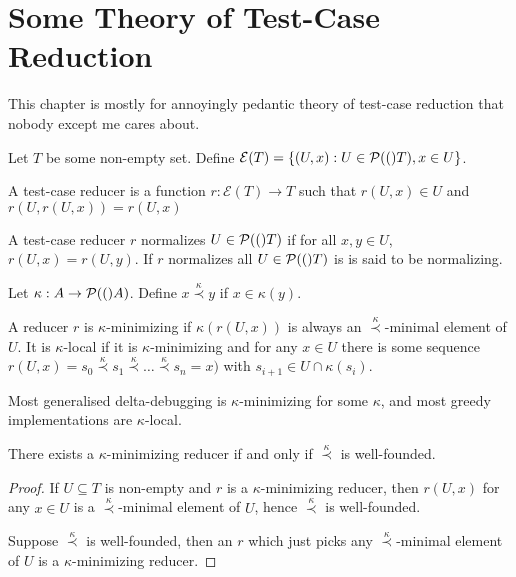 \chapter{Some Theory of Test-Case Reduction}

This chapter is mostly for annoyingly pedantic theory of test-case reduction that nobody except me cares about.

\newcommand{\exemplars}[1]{\mathcal{E}(#1)}

Let \(T\) be some non-empty set.
Define \(\exemplars{T} = \{ (U, x) : U \in \pow(T), x \in U \}\).

\begin{definition}
A test-case reducer is a function \(r: \exemplars{T} \to T\) such that \(r(U, x) \in U\) and \(r(U, r(U, x)) = r(U, x)\)
\end{definition}

\begin{definition}
A test-case reducer \(r\) normalizes \(U \in \mathcal{P}(()T)\) if for all \(x, y \in U\), \(r(U, x) = r(U, y)\).
If \(r\) normalizes all \(U \in \mathcal{P}(()T)\) is is said to be normalizing.
\end{definition}


\newcommand{\preckap}{\stackrel{\kappa}{\prec}}

\begin{definition}
Let \(\kappa: A \to \mathcal{P}(()A)\).
Define \(x \preckap y\) if \(x \in \kappa(y)\).

A reducer \(r\) is \(\kappa\)-minimizing if \(\kappa(r(U, x))\) is always an \(\preckap\)-minimal element of \(U\).
It is \(\kappa\)-local if it is \(\kappa\)-minimizing and for any \(x \in U\) there is some sequence \(r(U, x) = s_0 \preckap s_1 \preckap \ldots \preckap s_n = x)\) with \(s_{i + 1} \in U \cap \kappa(s_i)\).
\end{definition}

Most generalised delta-debugging is \(\kappa\)-minimizing for some \(\kappa\),
and most greedy implementations are \(\kappa\)-local.

\begin{proposition}
There exists a \(\kappa\)-minimizing reducer if and only if \(\preckap\) is well-founded.
\end{proposition}

\begin{proof}
If \(U \subseteq T\) is non-empty and \(r\) is a \(\kappa\)-minimizing reducer,
then \(r(U, x)\) for any \(x \in U\) is a \(\preckap\)-minimal element of \(U\),
hence \(\preckap\) is well-founded.

Suppose \(\preckap\) is well-founded,
then an \(r\) which just picks any \(\preckap\)-minimal element of \(U\) is a \(\kappa\)-minimizing reducer.
\end{proof}

